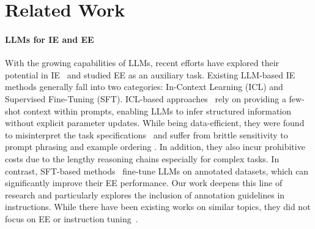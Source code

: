 \section{Related Work}
\label{sec:related-work}
\paragraph{LLMs for IE and EE} With the growing capabilities of LLMs, recent efforts have explored their potential in IE~\cite{xu2024large} and studied EE as an auxiliary task. Existing LLM-based IE methods generally fall into two categories: In-Context Learning (ICL) and Supervised Fine-Tuning (SFT). ICL-based approaches~\cite{li-etal-2023-codeie, guo2023retrievalaugmentedcodegenerationuniversal, ashok2023promptnerpromptingnamedentity, wang2023code4struct} rely on providing a few-shot context within prompts, enabling LLMs to infer structured information without explicit parameter updates. 
While being data-efficient, they were found to misinterpret the task specifications~\cite{gao2024eventrlenhancingeventextraction} and suffer from brittle sensitivity to prompt phrasing and example ordering \citep{gao2023exploringfeasibilitychatgptevent}. In addition, they also incur prohibitive costs due to the lengthy reasoning chains especially for complex tasks.
In contrast, SFT-based methods~\cite{lu-etal-2023-pivoine, wang2023instructuiemultitaskinstructiontuning, gui2024instructiebilingualinstructionbasedinformation, zhou2024universalnertargeteddistillationlarge} fine-tune LLMs on annotated datasets, which can significantly improve their EE performance. Our work deepens this line of research and particularly explores the inclusion of annotation guidelines in instructions. While there have been existing works on similar topics, they did not focus on EE \cite{sainz2024gollie} or instruction tuning~\cite{pang-etal-2023-guideline}.

